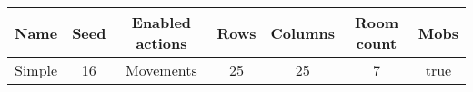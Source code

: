 \begin{tabular}{|c|c|c|c|c|c|c|}
\hline
Name & Seed & Enabled actions & Rows & Columns & Room count & Mobs\\
\hline
Simple & 16 & Movements & 25 & 25 & 7 & true\\
\hline
\end{tabular}